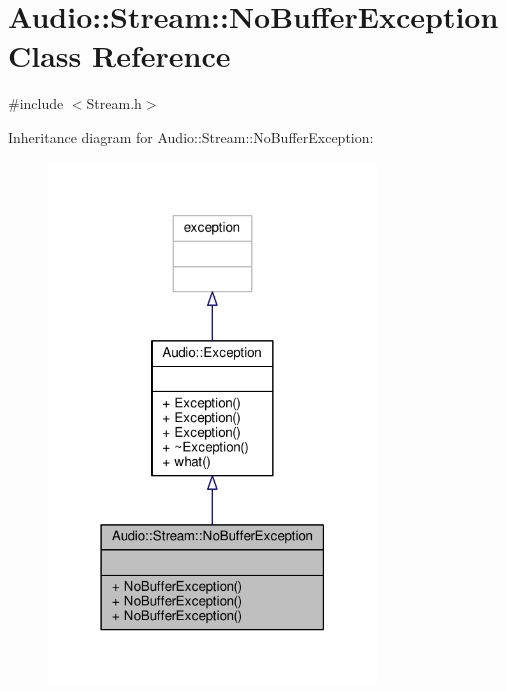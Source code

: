 \hypertarget{classAudio_1_1Stream_1_1NoBufferException}{}\section{Audio\+:\+:Stream\+:\+:No\+Buffer\+Exception Class Reference}
\label{classAudio_1_1Stream_1_1NoBufferException}


{\ttfamily \#include $<$Stream.\+h$>$}



Inheritance diagram for Audio\+:\+:Stream\+:\+:No\+Buffer\+Exception\+:
\nopagebreak
\begin{figure}[H]
\begin{center}
\leavevmode
\includegraphics[width=247pt]{d4/d69/classAudio_1_1Stream_1_1NoBufferException__inherit__graph}
\end{center}
\end{figure}


